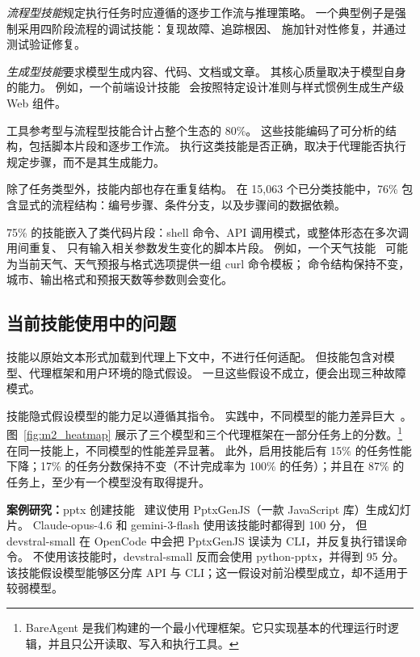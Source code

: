 \emph{流程型技能}规定执行任务时应遵循的逐步工作流与推理策略。
一个典型例子是强制采用四阶段流程的调试技能：复现故障、追踪根因、
施加针对性修复，并通过测试验证修复。

\emph{生成型技能}要求模型生成内容、代码、文档或文章。
其核心质量取决于模型自身的能力。
例如，一个前端设计技能~\cite{anthropic-skills-repo} 会按照特定设计准则与样式惯例生成生产级 Web 组件。

工具参考型与流程型技能合计占整个生态的 80\%。
这些技能编码了可分析的结构，包括脚本片段和逐步工作流。
执行这类技能是否正确，取决于代理能否执行规定步骤，而不是其生成能力。

除了任务类型外，技能内部也存在重复结构。
在 15,063 个已分类技能中，76\% 包含显式的流程结构：编号步骤、条件分支，以及步骤间的数据依赖。

75\% 的技能嵌入了类代码片段：shell 命令、API 调用模式，或整体形态在多次调用间重复、
只有输入相关参数发生变化的脚本片段。
例如，一个天气技能~\cite{openclaw} 可能为当前天气、天气预报与格式选项提供一组 curl 命令模板；
命令结构保持不变，城市、输出格式和预报天数等参数则会变化。

\subsection{当前技能使用中的问题}
\label{sec:insight:problems}

技能以原始文本形式加载到代理上下文中，不进行任何适配。
但技能包含对模型、代理框架和用户环境的隐式假设。
一旦这些假设不成立，便会出现三种故障模式。

技能隐式假设模型的能力足以遵循其指令。
实践中，不同模型的能力差异巨大~\cite{lu2024agentbench}。
图~\ref{fig:m2_heatmap} 展示了三个模型和三个代理框架在一部分任务上的分数。\footnote{BareAgent 是我们构建的一个最小代理框架。它只实现基本的代理运行时逻辑，并且只公开读取、写入和执行工具。}
在同一技能上，不同模型的性能差异显著。
此外，启用技能后有 15\% 的任务性能下降；17\% 的任务分数保持不变（不计完成率为 100\% 的任务）；并且在 87\% 的任务上，至少有一个模型没有取得提升。
\begin{examplebox}
\textbf{案例研究：}pptx 创建技能~\cite{anthropic-skills-repo}
建议使用 PptxGenJS（一款 JavaScript 库）生成幻灯片。
Claude-opus-4.6 和 gemini-3-flash 使用该技能时都得到 100 分，
但 devstral-small 在 OpenCode 中会把 PptxGenJS 误读为 CLI，并反复执行错误命令。
不使用该技能时，devstral-small 反而会使用 python-pptx，并得到 95 分。
该技能假设模型能够区分库 API 与 CLI；这一假设对前沿模型成立，却不适用于较弱模型。
\end{examplebox}

